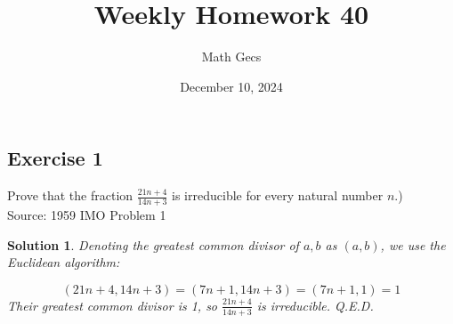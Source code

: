\documentclass[12pt]{article}
\title{Weekly Homework 40}
\author{Math Gecs}
\date{December 10, 2024}
\newtheorem*{solution*}{Solution}
\begin{document}
\maketitle

\subsection*{Exercise 1}
Prove that the fraction $\frac{21n+4}{14n+3}$ is irreducible for every natural number $n$.)\\

Source: 1959 IMO Problem 1\\

\begin{solution*}
Denoting the greatest common divisor of $a, b$ as $(a,b)$, we use the Euclidean algorithm:

\[(21n+4, 14n+3) = (7n+1, 14n+3) = (7n+1, 1) = 1\]
Their greatest common divisor is 1, so $\frac{21n+4}{14n+3}$ is irreducible. Q.E.D.
\end{solution*}
\end{document}
